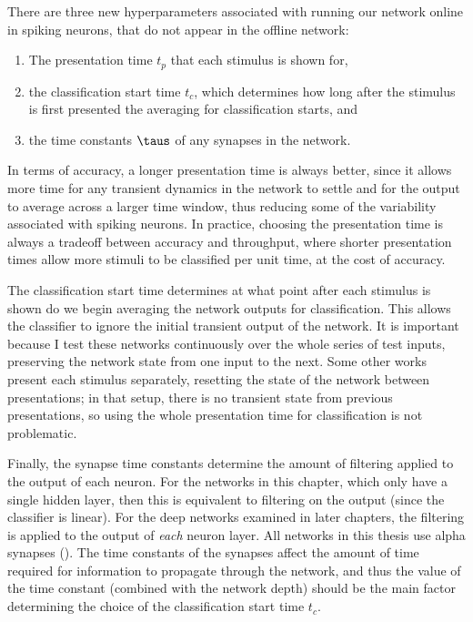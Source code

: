 There are three new hyperparameters associated with running our network online
in spiking neurons, that do not appear in the offline network:
\begin{enumerate}
  \item The presentation time $t_p$ that each stimulus is shown for,
  \item the classification start time $t_c$,
    which determines how long after the stimulus is first presented
    the averaging for classification starts, and
  \item the time constants $\taus$ of any synapses in the network.
\end{enumerate}
In terms of accuracy, a longer presentation time is always better,
since it allows more time for any transient dynamics in the network to settle
and for the output to average across a larger time window,
thus reducing some of the variability associated with spiking neurons.
In practice, choosing the presentation time
is always a tradeoff between accuracy and throughput,
where shorter presentation times allow more stimuli to be classified
per unit time,
at the cost of accuracy.

The classification start time determines at what point after each stimulus is shown
do we begin averaging the network outputs for classification.
This allows the classifier to ignore the initial transient output of the network.
It is important because I test these networks continuously
over the whole series of test inputs,
preserving the network state from one input to the next.
Some other works \parencite[\eg/][]{Cao2014,Diehl2015} present each stimulus separately,
resetting the state of the network between presentations;
in that setup, there is no transient state from previous presentations,
so using the whole presentation time for classification is not problematic.

Finally, the synapse time constants determine the amount of filtering
applied to the output of each neuron.
For the networks in this chapter,
which only have a single hidden layer,
then this is equivalent to filtering on the output (since the classifier is linear).
For the deep networks examined in later chapters,
the filtering is applied to the output of \emph{each} neuron layer.
All networks in this thesis use alpha synapses ().
The time constants of the synapses affect the amount of time required
for information to propagate through the network,
and thus the value of the time constant (combined with the network depth)
should be the main factor determining the choice
of the classification start time $t_c$.

